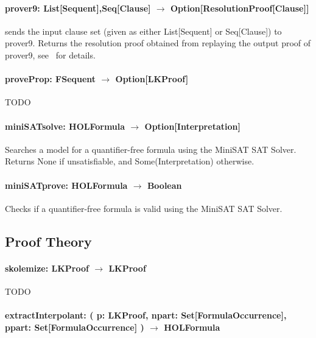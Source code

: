 \documentclass[a4paper, 11pt]{report}
\begin{document}
\paragraph{\textbf{prover9: List[Sequent],Seq[Clause] $\rightarrow$ Option[ResolutionProof[Clause]]}}
sends the input clause set (given as either List[Sequent] or Seq[Clause]) to prover9. Returns
the resolution proof obtained from replaying the output proof of prover9,
see~\cite{Dunchev12System} for details.

\paragraph{\textbf{proveProp: FSequent $\rightarrow$ Option[LKProof]}}
{\color{red}TODO}

\paragraph{\textbf{miniSATsolve: HOLFormula $\rightarrow$ Option[Interpretation]}}
Searches a model for a quantifier-free formula using the MiniSAT SAT Solver.
Returns None if unsatisfiable, and Some(Interpretation) otherwise.

\paragraph{\textbf{miniSATprove: HOLFormula $\rightarrow$ Boolean}}
Checks if a quantifier-free formula is valid using the MiniSAT SAT Solver.

\subsection{Proof Theory}

\paragraph{\textbf{skolemize: LKProof $\rightarrow$ LKProof}}
{\color{red}TODO}

\paragraph{\textbf{extractInterpolant: ( p: LKProof, npart: Set[FormulaOccurrence],
ppart: Set[FormulaOccurrence] ) $\rightarrow$ HOLFormula}}
\end{document}
